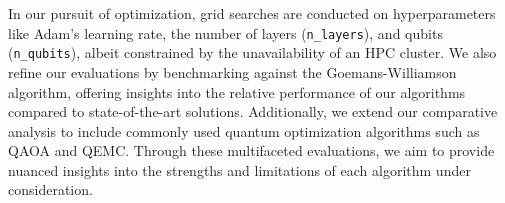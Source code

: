 In our pursuit of optimization, grid searches are conducted on hyperparameters like Adam's learning rate, the number of layers (\texttt{n\_layers}), and qubits (\texttt{n\_qubits}), albeit constrained by the unavailability of an HPC cluster. We also refine our evaluations by benchmarking against the Goemans-Williamson algorithm, offering insights into the relative performance of our algorithms compared to state-of-the-art solutions. Additionally, we extend our comparative analysis to include commonly used quantum optimization algorithms such as QAOA and QEMC. Through these multifaceted evaluations, we aim to provide nuanced insights into the strengths and limitations of each algorithm under consideration.